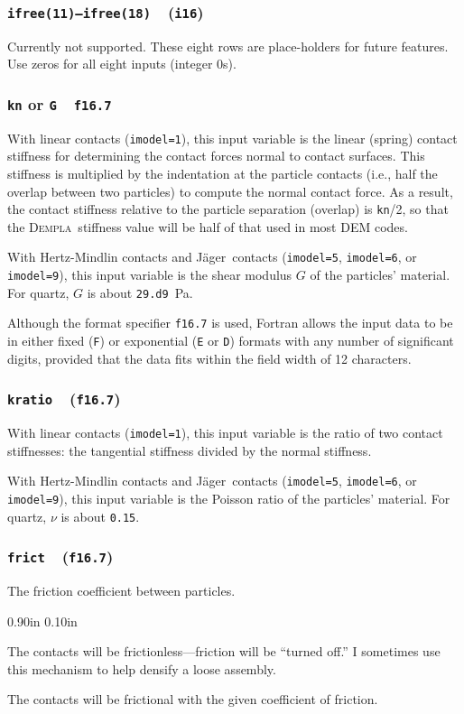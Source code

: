 \documentclass[letterpaper,11pt]{article}
\newcommand{\Dempla}{\textsc{Dempla}}
\newcommand{\Var}[2]{\texttt{#1}\ \  (\texttt{#2})}
\newlength{\Labelwidth}
\newcommand{\Entrylabel}[1]{\makebox[\Labelwidth][r]{\texttt{#1}}}
\newenvironment{Options}
{\begin{list}{}{%
\renewcommand{\makelabel}{\Entrylabel}%
\setlength{\leftmargin} {0.90in}%
\setlength{\rightmargin}{0.00in}%
\setlength{\labelsep}   {0.10in}%
\setlength{\labelwidth} {\Labelwidth}%
}}
{\end{list}}
\begin{document}
\subsubsection[\texttt{ifree}]{\Var{ifree(11)--ifree(18)}{i16}}\label{sec:ifree}
Currently not supported.
These eight rows are place-holders for future features.
Use zeros for all eight inputs (integer 0s).
%
%
%
%
\subsubsection[\texttt{kn} or \texttt{G}]{\texttt{kn} or \texttt{G}\ \ \texttt{f16.7}}\label{sec:kn}
With linear contacts (\texttt{imodel=1}), this input variable is
the linear (spring) contact stiffness for determining the contact
forces normal to 
contact surfaces.
This stiffness is multiplied by the indentation at the particle contacts
(i.e., half the overlap between two particles) to compute the
normal contact force.
As a result, the contact stiffness relative to the particle
separation (overlap) is \texttt{kn}/2, so that the \Dempla\ stiffness
value will be half of that used in most DEM codes.
\par
With Hertz-Mindlin contacts and J\"{a}ger\ contacts 
(\texttt{imodel=5}, \texttt{imodel=6}, or \texttt{imodel=9}),
this input variable is
the shear modulus $G$ of the particles' material.
For quartz, $G$ is about \texttt{29.d9}~Pa.
\par
Although the format specifier \texttt{f16.7} is used, Fortran allows 
the input data to be in either fixed (\texttt{F}) or
exponential (\texttt{E} or \texttt{D}) formats with any number
of significant digits, provided that the data fits within the field
width of 12 characters.
%
\subsubsection[\texttt{kratio}]{\Var{kratio}{f16.7}}\label{sec:kratio}
With linear contacts (\texttt{imodel=1}), this input variable is
the ratio of two contact stiffnesses:  the tangential stiffness divided
by the normal stiffness.
\par
With Hertz-Mindlin contacts and J\"{a}ger\ contacts
(\texttt{imodel=5}, \texttt{imodel=6}, or \texttt{imodel=9}), 
this input variable is the Poisson ratio of the particles' material.
For quartz, $\nu$ is about \texttt{0.15}.
%
\subsubsection[\texttt{frict}]{\Var{frict}{f16.7}}\label{sec:frict}
The friction coefficient between particles.
\begin{Options}
\item[frict=0.]
The contacts will be frictionless---friction will be ``turned off.''
I sometimes use this mechanism to help densify a loose assembly.
\item[frict>0.]
The contacts will be frictional with the given coefficient of friction.
\end{Options}
%
\end{document}
